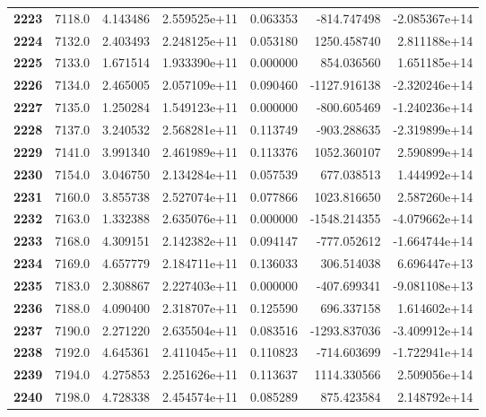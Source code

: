 \documentclass{report}[12pt]
\begin{document}
\begin{center}
\begin{tabular}{lrrrrrr}
\textbf{2223} &         7118.0 &   4.143486 &  2.559525e+11 &    0.063353 &  -814.747498 & -2.085367e+14 \\
\textbf{2224} &         7132.0 &   2.403493 &  2.248125e+11 &    0.053180 &  1250.458740 &  2.811188e+14 \\
\textbf{2225} &         7133.0 &   1.671514 &  1.933390e+11 &    0.000000 &   854.036560 &  1.651185e+14 \\
\textbf{2226} &         7134.0 &   2.465005 &  2.057109e+11 &    0.090460 & -1127.916138 & -2.320246e+14 \\
\textbf{2227} &         7135.0 &   1.250284 &  1.549123e+11 &    0.000000 &  -800.605469 & -1.240236e+14 \\
\textbf{2228} &         7137.0 &   3.240532 &  2.568281e+11 &    0.113749 &  -903.288635 & -2.319899e+14 \\
\textbf{2229} &         7141.0 &   3.991340 &  2.461989e+11 &    0.113376 &  1052.360107 &  2.590899e+14 \\
\textbf{2230} &         7154.0 &   3.046750 &  2.134284e+11 &    0.057539 &   677.038513 &  1.444992e+14 \\
\textbf{2231} &         7160.0 &   3.855738 &  2.527074e+11 &    0.077866 &  1023.816650 &  2.587260e+14 \\
\textbf{2232} &         7163.0 &   1.332388 &  2.635076e+11 &    0.000000 & -1548.214355 & -4.079662e+14 \\
\textbf{2233} &         7168.0 &   4.309151 &  2.142382e+11 &    0.094147 &  -777.052612 & -1.664744e+14 \\
\textbf{2234} &         7169.0 &   4.657779 &  2.184711e+11 &    0.136033 &   306.514038 &  6.696447e+13 \\
\textbf{2235} &         7183.0 &   2.308867 &  2.227403e+11 &    0.000000 &  -407.699341 & -9.081108e+13 \\
\textbf{2236} &         7188.0 &   4.090400 &  2.318707e+11 &    0.125590 &   696.337158 &  1.614602e+14 \\
\textbf{2237} &         7190.0 &   2.271220 &  2.635504e+11 &    0.083516 & -1293.837036 & -3.409912e+14 \\
\textbf{2238} &         7192.0 &   4.645361 &  2.411045e+11 &    0.110823 &  -714.603699 & -1.722941e+14 \\
\textbf{2239} &         7194.0 &   4.275853 &  2.251626e+11 &    0.113637 &  1114.330566 &  2.509056e+14 \\
\textbf{2240} &         7198.0 &   4.728338 &  2.454574e+11 &    0.085289 &   875.423584 &  2.148792e+14 \\

\end{tabular}
\end{center}
\end{document}

